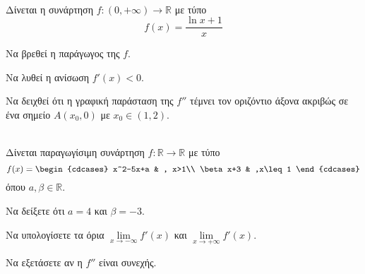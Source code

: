 \documentclass[twoside,nofonts,ektypwsh]{frontisthrio-diag}
\begin{document}
\begin{thema}
\begin{multicols}{2}
\begin{erwthma}
\end{erwthma}
\end{multicols}
\item\mbox{}\\
Δίνεται η συνάρτηση $ f:(0,+\infty)\to\mathbb{R} $ με τύπο
\[ f(x)=\frac{\ln{x}+1}{x} \]
\begin{erwthma}
\item Να βρεθεί η παράγωγος της $ f $.
\item Να λυθεί η ανίσωση $ f'(x)<0 $.
\item Να δειχθεί ότι η γραφική παράσταση της $ f'' $ τέμνει τον οριζόντιο άξονα ακριβώς σε ένα σημείο $ A(x_0,0) $ με $ x_0\in(1,2) $.\\
\end{erwthma} 
\item\mbox{}\\
Δίνεται παραγωγίσιμη συνάρτηση $ f:\mathbb{R}\to\mathbb{R} $ με τύπο
\[ f(x)=\begin{cdcases}
x^2-5x+a & , x>1\\
\beta x+3 & ,x\leq 1
\end{cdcases} \]
όπου $ a,\beta\in\mathbb{R} $.
\begin{erwthma}
\item Να δείξετε ότι $ a=4 $ και $ \beta=-3 $.
\item Να υπολογίσετε τα όρια $ \lim\limits_{x\to-\infty}{f'(x)} $ και $ \lim\limits_{x\to+\infty}{f'(x)} $.
\item Να εξετάσετε αν η $ f'' $ είναι συνεχής.
\end{erwthma}
\end{thema}
\end{document}
